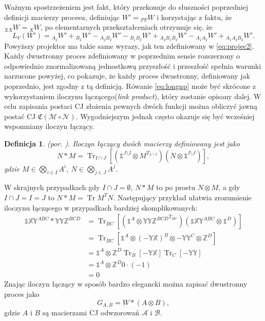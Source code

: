 \documentclass[10pt]{article} %
\newtheorem{definicja}{Definicja}
\DeclareMathOperator{\Trs}{Tr}
\newcommand{\X}{\mathbb{X}}
\newcommand{\Y}{\mathbb{Y}}
\newcommand{\Z}{\mathbb{Z}}
\newcommand{\I}{\mathbb{1}}
\newcommand{\MCJ}{\mathfrak{C}}
\begin{document}
Ważnym spostrzeżeniem jest fakt, który przekonuje do słuszności poprzedniej definicji macierzy procesu, definiując $W' = {}_{PF}W$ i korzystając z faktu, że
${}_{XX}W = {}_{X}W$, po elementarnych przekształceniach otrzymuje się, że
\begin{equation}
\label{nlw}
L_V(W') = {}_{A_2}W' + {}_{B_2}W' - {}_{A_2B_2}W' - {}_{B_1B_2}W' + {}_{A_2B_1B_2}W' - {}_{A_1A_2}W' + {}_{A_1A_2B_2}W'.
\end{equation}
Powyższy projektor ma takie same wyrazy, jak ten zdefiniowany w \eqref{eq:projec2}.
Każdy dwustronny proces zdefiniowany w poprzednim sensie rozszerzony o odpowiednio znormalizowaną jednostkową przyszłość i przeszłość spełnia warunki narzucone powyżej, co pokazuje, że każdy proces dwustronny, definiowany jak poprzednio, jest zgodny z tą definicją.
Rówanie \eqref{eq:longnp} może być skrócone z wykorzystaniem iloczynu łączącego(\textit{link product}), który zostanie opisany dalej.
W celu zapisania postaci CJ złożenia pewnych dwóch funkcji można obliczyć jawną postać CJ $\MCJ(\mathcal{M} \circ \mathcal{N})$. Wygodniejszym
jednak często okazuje się być wcześniej wspomniany iloczyn łączący. 
\begin{definicja}
(por. \cite{purification}).
Iloczyn łączący dwóch macierzy definiowany jest jako
\begin{equation}
N * M = \Trs_{I\cap J}\left[ (\I^{J\setminus I} \otimes M^{T_{I\cap J}})(N \otimes \I^{I\setminus J})\right],
\end{equation}
gdzie $M \in \bigotimes_{i \in I} A^i,~N \in \bigotimes_{j \in J} A^j$.
\end{definicja} W skrajnych przypadkach gdy $I \cap J = \emptyset$, $N*M$ to po prostu $N \otimes M$, a
gdy $I \cap J = I = J$ to $N * M = \Trs M^T N$. Następujący przykład ułatwia zrozumienie iloczynu łączącego w przypadkach bardziej skomplikowanych:
\begin{equation}
\begin{split}
\I\X\Y^{ABC} * \Y\Y\Z^{BCD} &= \Trs_{BC} \left[ \left(\I^{A} \otimes {\Y\Y\Z^{BCD}}^{T_{BC}}\right)\left(\I\X\Y^{ABC} \otimes \I^D\right)\right] \\
&= \Trs_{BC} \left[ \I^A \otimes (-\Y\X)^{B} \otimes {-\Y\Y}^{C} \otimes \Z^{D}\right] \\
&= \I^{A} \otimes \Z^{D} \Trs_{B} \left[ -\Y\X \right]\Trs_{C}\left[-\Y\Y\right] \\
&= \I^{A} \otimes \Z^{D} 0 \cdot (-1) \\
&= 0
\end{split}
\end{equation}
Znając iloczyn łączący w sposób bardzo elegancki można zapisać dwustronny proces jako
\begin{equation}
G_{A,B} = W * (A \otimes B),
\end{equation} gdzie $A$ i $B$ są macierzami CJ odwzorowań $\mathcal{A}$ i $\mathcal{B}$.
\end{document}
